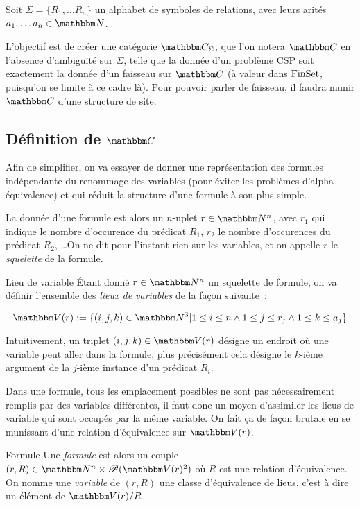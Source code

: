 
Soit $\Sigma = \{R_1, \dots R_n\}$ un alphabet de symboles de relations, avec
leurs arités $a_1, \dots a_n\in\N$.

L'objectif est de créer une catégorie $\C_\Sigma$, que l'on notera $\C$ en l'absence
d'ambiguïté sur $\Sigma$, telle que la donnée d'un problème CSP soit exactement la donnée
d'un faisseau sur $\C$ (à valeur dans $\text{FinSet}$, puisqu'on se limite à ce cadre là). Pour
pouvoir parler de faisseau, il faudra munir $\C$ d'une structure de site.

\subsection{Définition de $\C$}

Afin de simplifier, on va essayer de donner une représentation des formules indépendante
du renommage des variables (pour éviter les problèmes d'alpha-équivalence) et qui réduit
la structure d'une formule à son plus simple.

La donnée d'une formule est alors un $n$-uplet $r\in\N^n$, avec $r_1$ qui indique le
nombre d'occurence du prédicat $R_1$, $r_2$ le nombre d'occurences du prédicat $R_2$,
\dots On ne dit pour l'instant rien sur les variables, et on appelle $r$ le 
\emph{squelette} de la formule.

\begin{defi}{Lieu de variable}
    Étant donné $r\in\N^n$ un squelette de formule, on va définir l'ensemble des
    \emph{lieux de variables} de la façon suivante~:

    \[ \V(r):= \{(i,j,k)\in\N^3 |        1\leq i\leq n
                                  \wedge 1\leq j\leq r_j
                                  \wedge 1\leq k\leq a_j\} \]

    Intuitivement, un triplet $(i,j,k)\in\V(r)$ désigne un endroit où une variable peut
    aller dans la formule, plus précisément cela désigne le $k$-ième argument de la
    $j$-ième instance d'un prédicat $R_i$.
\end{defi}

Dans une formule, tous les emplacement possibles ne sont pas nécessairement remplis
par des variables différentes, il faut donc un moyen d'assimiler les lieus de variable
qui sont occupés par la même variable. On fait ça de façon brutale en se munissant d'une
relation d'équivalence sur $\V(r)$.

\begin{defi}{Formule}
    Une \emph{formule} est alors un couple $(r,R)\in\N^n\times\P(\V(r)^2)$ où $R$ est
    une relation d'équivalence. On nomme une \emph{variable} de $(r,R)$ une classe
    d'équivalence de lieus, c'est à dire un élément de $\V(r)/R$.
\end{defi}

